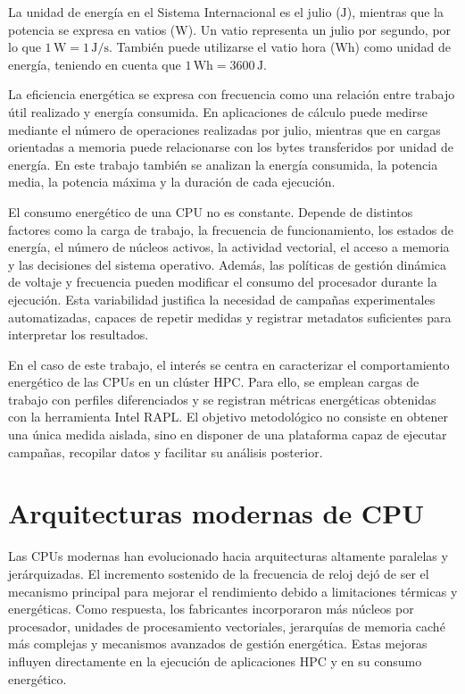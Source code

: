 La unidad de energía en el Sistema Internacional es el julio (\(\mathrm{J}\)), mientras que la potencia se expresa en vatios (\(\mathrm{W}\)). Un vatio representa un julio por segundo, por lo que \(1\,\mathrm{W}=1\,\mathrm{J}/\mathrm{s}\). También puede utilizarse el vatio hora (\(\mathrm{Wh}\)) como unidad de energía, teniendo en cuenta que \(1\,\mathrm{Wh}=3600\,\mathrm{J}\).

La eficiencia energética se expresa con frecuencia como una relación entre trabajo útil realizado y energía consumida. En aplicaciones de cálculo puede medirse mediante el número de operaciones realizadas por julio, mientras que en cargas orientadas a memoria puede relacionarse con los bytes transferidos por unidad de energía. En este trabajo también se analizan la energía consumida, la potencia media, la potencia máxima y la duración de cada ejecución.

El consumo energético de una CPU no es constante. Depende de distintos factores como la carga de trabajo, la frecuencia de funcionamiento, los estados de energía, el número de núcleos activos, la actividad vectorial, el acceso a memoria y las decisiones del sistema operativo. Además, las políticas de gestión dinámica de voltaje y frecuencia pueden modificar el consumo del procesador durante la ejecución. Esta variabilidad justifica la necesidad de campañas experimentales automatizadas, capaces de repetir medidas y registrar metadatos suficientes para interpretar los resultados.

En el caso de este trabajo, el interés se centra en caracterizar el comportamiento energético de las CPUs en un clúster HPC. Para ello, se emplean cargas de trabajo con perfiles diferenciados y se registran métricas energéticas obtenidas  con la herramienta Intel RAPL. El objetivo metodológico no consiste en obtener una única medida aislada, sino en disponer de una plataforma capaz de ejecutar campañas, recopilar datos y facilitar su análisis posterior.

\section{Arquitecturas modernas de CPU}

Las CPUs modernas han evolucionado hacia arquitecturas altamente paralelas y jerárquizadas. El incremento sostenido de la frecuencia de reloj dejó de ser el mecanismo principal para mejorar el rendimiento debido a limitaciones térmicas y energéticas. Como respuesta, los fabricantes incorporaron más núcleos por procesador, unidades de procesamiento vectoriales, jerarquías de memoria caché más complejas y mecanismos avanzados de gestión energética. Estas mejoras influyen directamente en la ejecución de aplicaciones HPC y en su consumo energético.

